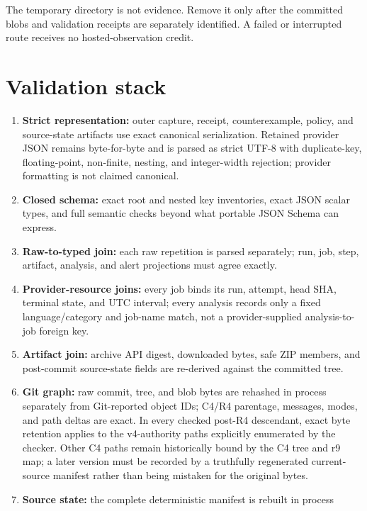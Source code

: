 \documentclass[11pt,a4paper]{article}
\newcommand{\Important}[1]{\textcolor{PidPrimary}{\textbf{#1}}}
\begin{document}
The temporary directory is not evidence. Remove it only after the committed blobs and validation
receipts are separately identified. A failed or interrupted route receives no hosted-observation
credit.

\section{Validation stack}

\begin{enumerate}
  \item \Important{Strict representation:} outer capture, receipt, counterexample, policy, and
        source-state artifacts use exact canonical serialization. Retained provider JSON remains
        byte-for-byte and is parsed as strict UTF-8 with duplicate-key, floating-point, non-finite,
        nesting, and integer-width rejection; provider formatting is not claimed canonical.
  \item \Important{Closed schema:} exact root and nested key inventories, exact JSON scalar types,
        and full semantic checks beyond what portable JSON Schema can express.
  \item \Important{Raw-to-typed join:} each raw repetition is parsed separately; run, job,
        step, artifact, analysis, and alert projections must agree exactly.
  \item \Important{Provider-resource joins:} every job binds its run, attempt, head SHA, terminal
        state, and UTC interval; every analysis records only a fixed language/category and job-name
        match, not a provider-supplied analysis-to-job foreign key.
  \item \Important{Artifact join:} archive API digest, downloaded bytes, safe ZIP members, and
        post-commit source-state fields are re-derived against the committed tree.
  \item \Important{Git graph:} raw commit, tree, and blob bytes are rehashed in process separately
        from Git-reported object IDs; C4/R4
        parentage, messages, modes, and path deltas are exact. In every checked post-R4
        descendant, exact byte retention applies to the v4-authority paths explicitly enumerated
        by the checker. Other C4 paths remain historically bound by the C4 tree and r9 map; a later
        version must be recorded by a truthfully regenerated current-source manifest rather than
        being mistaken for the original bytes.
  \item \Important{Source state:} the complete deterministic manifest is rebuilt in process

\end{enumerate}
\end{document}
